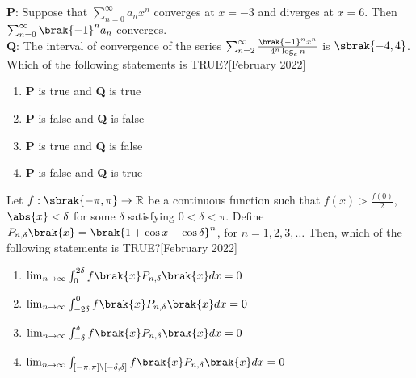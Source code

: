 \item \textbf{P}: Suppose that $\sum_{n=0}^{\infty} a_n x^n$ converges at $x = -3$ and diverges at $x = 6$. Then 
$\sum_{n=0}^{\infty} \brak{-1}^n a_n$ converges.
\\\textbf{Q}: The interval of convergence of the series $\sum_{n=2}^{\infty} \frac{\brak{-1}^n x^n}{4^n \log_e n}$ is $\sbrak{-4,4}$.
\\Which of the following statements is TRUE?\hfill[February 2022]
\begin{enumerate}
    \item \textbf{P} is true and \textbf{Q} is true
    \item \textbf{P} is false and \textbf{Q} is false
    \item \textbf{P} is true and \textbf{Q} is false
    \item \textbf{P} is false and \textbf{Q} is true
\end{enumerate}
\item Let $f : \sbrak{-\pi, \pi} \rightarrow \mathbb{R}$ be a continuous function such that $f(x) > \frac{f(0)}{2}$, $\abs{x} < \delta$ for some $\delta$ satisfying $0 < \delta < \pi$. Define $P_{n, \delta}\brak{x} = \brak{1 + \cos {x} - \cos {\delta}}^n$, for $n = 1, 2, 3, \dots$ Then, which of the following statements is TRUE?\hfill[February 2022]
\begin{enumerate}
\item $\lim_{n \to \infty} \int_{0}^{2\delta} f\brak{x} P_{n, \delta}\brak{x} dx = 0$
\item$\lim_{n \to \infty} \int_{-2\delta}^{0} f\brak{x} P_{n, \delta}\brak{x} dx = 0$
\item $\lim_{n \to \infty} \int_{-\delta}^{\delta} f\brak{x} P_{n, \delta}\brak{x} dx = 0$
\item $\lim_{n \to \infty} \int_{[-\pi, \pi] \backslash [-\delta, \delta]} f\brak{x} P_{n, \delta}\brak{x} dx = 0$
\end{enumerate}

